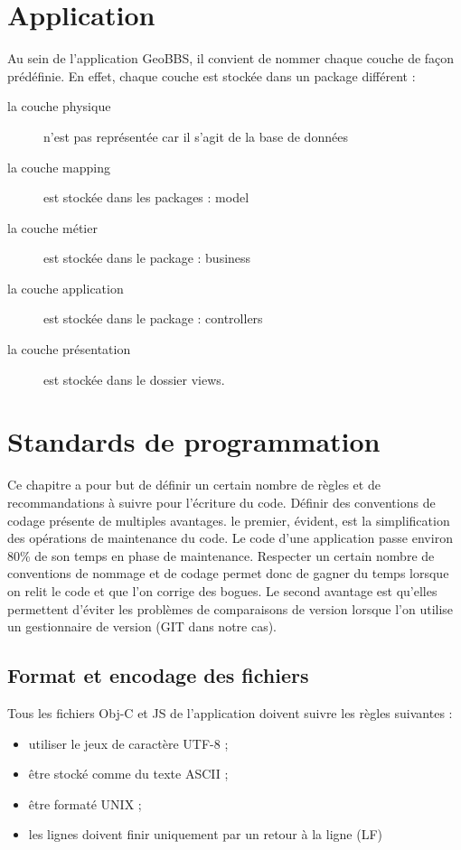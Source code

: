 \documentclass[a4paper,12pt]{report}
\begin{document}
\begin{onehalfspace}
\chapter{Application}
Au sein de l’application GeoBBS, il convient de nommer chaque couche de façon prédéfinie. En effet, chaque couche est stockée dans un package différent :
\begin{description}
\item[la couche physique] n’est pas représentée car il s’agit de la base de données
\item[la couche mapping] est stockée dans les packages : model
\item[la couche métier] est stockée dans le package : business
\item[la couche application] est stockée dans le package : controllers
\item[la couche présentation] est stockée dans le dossier views.
\end{description}

\chapter{Standards de programmation}

Ce chapitre a pour but de définir un certain nombre de règles et de recommandations à suivre pour l'écriture du code. Définir des conventions de codage présente de multiples avantages. le premier, évident, est la simplification des opérations de maintenance du code. Le code d'une application passe environ 80\% de son temps en phase de maintenance. Respecter un certain nombre de conventions de nommage et de codage permet donc de gagner du temps lorsque on relit le code et que l'on corrige des bogues. Le second avantage est qu'elles permettent d'éviter les problèmes de comparaisons de version lorsque l'on utilise un gestionnaire de version (GIT dans notre cas).

\section{Format et encodage des fichiers}

Tous les fichiers Obj-C et JS de l'application doivent suivre les règles suivantes :
\begin{itemize}
	\item utiliser le jeux de caractère UTF-8 ;
	\item être stocké comme du texte ASCII ;
	\item être formaté UNIX ;
	\item les lignes doivent finir uniquement par un retour à la ligne (LF)
\end{itemize}


\end{onehalfspace}
\end{document}
